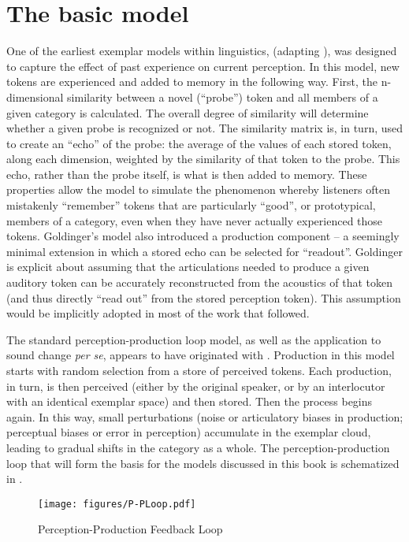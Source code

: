\chapter{The basic model}\label{ch:The-Exemplar-Model}

One of the earliest exemplar models within linguistics, \citet{Goldinger1996}
(adapting \citealt{hintzman1984minerva}), was designed to capture the
effect of past experience on current perception. In this model, new
tokens are experienced and added to memory in the following way. First,
the n-dimensional similarity between a novel (``probe'') token and all
members of a given category is calculated. The overall degree of
similarity will determine whether a given probe is recognized or not.
The similarity matrix is, in turn, used to create an ``echo'' of the
probe: the average of the values of each stored token, along each
dimension, weighted by the similarity of that token to the probe. This echo, rather
than the probe itself, is what is then added to memory. These properties
allow the model to simulate the phenomenon whereby listeners often
mistakenly ``remember'' tokens that are particularly ``good'', or prototypical,
members of a category, even when they have never actually experienced
those tokens. Goldinger's model also introduced a production component
– a seemingly minimal extension in which a stored echo can be selected
for ``readout''. Goldinger is explicit about assuming that the articulations
needed to produce a given auditory token can be accurately reconstructed
from the acoustics of that token (and thus directly ``read out'' from
the stored perception token). This assumption would be implicitly
adopted in most of the work that followed. 

The standard perception-production loop model, as well as the application
to sound change \emph{per se}, appears to have originated with \citet{Pierrehumbert2000}.
Production in this model starts with random selection from a store
of perceived tokens. Each production, in turn, is then perceived (either
by the original speaker, or by an interlocutor with an identical exemplar
space) and then stored. Then the process begins again. In this way,
small perturbations (noise or articulatory biases in production; perceptual
biases or error in perception) accumulate in the exemplar cloud, leading
to gradual shifts in the category as a whole. The perception-production
loop that will form the basis for the models discussed in this book
is schematized in .

\begin{figure}[H]

\begin{centering}
\texttt{[image: figures/P-PLoop.pdf]}\caption{\label{fig:Feedback Loop}Perception-Production Feedback Loop}
\par\end{centering}
\end{figure}

